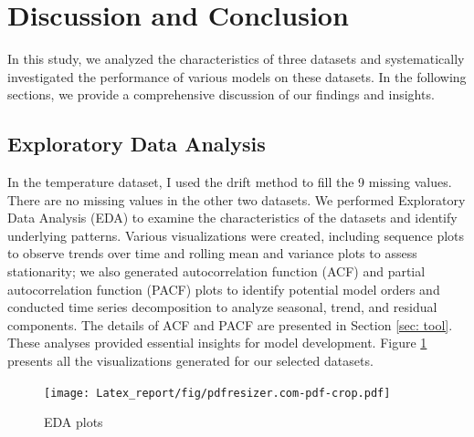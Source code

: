 \documentclass{scrartcl}
\begin{document}
\section{Discussion and Conclusion}
In this study, we analyzed the characteristics of three datasets and systematically investigated the performance of various models on these datasets. In the following sections, we provide a comprehensive discussion of our findings and insights.

\subsection{Exploratory Data Analysis}
In the temperature dataset, I used the drift method to fill the 9 missing values. There are no missing values in the other two datasets. We performed Exploratory Data Analysis (EDA) to examine the characteristics of the datasets and identify underlying patterns. Various visualizations were created, including sequence plots to observe trends over time and rolling mean and variance plots to assess stationarity; we also generated autocorrelation function (ACF) and partial autocorrelation function (PACF) plots to identify potential model orders and conducted time series decomposition to analyze seasonal, trend, and residual components. The details of ACF and PACF are presented in Section \ref{sec: tool}. These analyses provided essential insights for model development. Figure \ref{fig:eda_plot} presents all the visualizations generated for our selected datasets.
\begin{figure}[H]
	\begin{center}
		\texttt{[image: Latex\_report/fig/pdfresizer.com-pdf-crop.pdf]}
	\end{center}
	\caption{EDA plots}
	\label{fig:eda_plot}
\end{figure}

\begin{table}[ht]
\centering
\caption{Strength of Trend and Seasonality for Each Dataset}
\label{tab:trend_seasonality}
\end{table}
\end{document}
